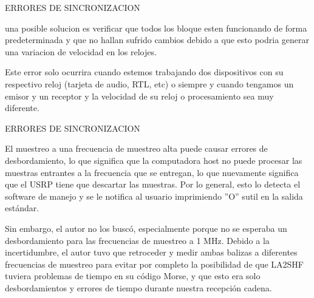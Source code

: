 \begin{frame}{ERRORES DE SINCRONIZACION}

una posible solucion es verificar que todos los bloque esten funcionando de forma predeterminada y que no hallan sufrido cambios debido a que esto podria generar una variacion de velocidad en los relojes.\\ \vspace{2mm}

Este error solo ocurrira cuando estemos trabajando dos dispositivos con su respectivo reloj (tarjeta de audio, RTL, etc) o siempre y cuando tengamos un emisor y un receptor y la velocidad de su reloj o procesamiento sea muy diferente.\\ \vspace{2mm}

\end{frame}

\begin{frame}{ERRORES DE SINCRONIZACION}

El muestreo a una frecuencia de muestreo alta puede causar errores de desbordamiento, lo que significa que la computadora host no puede procesar las muestras entrantes a la frecuencia que se entregan, lo que nuevamente significa que el USRP tiene que descartar las muestras. Por lo general, esto lo detecta el software de manejo y se le notifica al usuario imprimiendo ”O” sutil en la salida estándar. \\ \vspace{2mm}

Sin embargo, el autor no los buscó, especialmente porque no se esperaba un desbordamiento para las frecuencias de muestreo a 1 MHz. Debido a la incertidumbre, el autor tuvo que retroceder y medir ambas balizas a diferentes frecuencias de muestreo para evitar por completo la posibilidad de que LA2SHF tuviera problemas de tiempo en su código Morse, y que esto era solo desbordamientos y errores de tiempo durante nuestra recepción cadena.\\ \vspace{2mm}

\end{frame}


